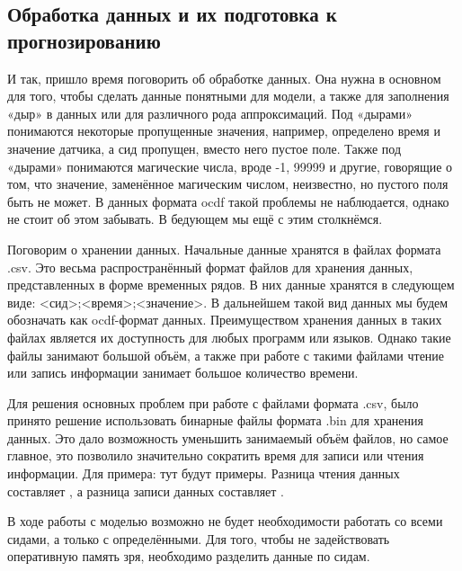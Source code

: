 \titlespace
\subsection*{ 
  \cyrillicfont 
  \fontsize{14pt}{0pt}\selectfont
  \englishfont
   Обработка данных и их подготовка к прогнозированию
} 
\titlespace

{\cyrillicfont 
\fontsize{13pt}{16.25pt}\selectfont 
\englishfont 

  \par \redline И так, пришло время поговорить об обработке данных. Она нужна в основном для того, чтобы сделать данные понятными для модели, а также для заполнения «дыр» в данных или для различного рода аппроксимаций. Под «дырами» понимаются некоторые пропущенные значения, например, определено время и значение датчика, а сид пропущен, вместо него пустое поле. Также под «дырами» понимаются магические числа, вроде -1, 99999 и другие, говорящие о том, что значение, заменённое магическим числом, неизвестно, но пустого поля быть не может. В данных формата ocdf такой проблемы не наблюдается, однако не стоит об этом забывать. В бедующем мы ещё с этим столкнёмся.

  \par \redline Поговорим о хранении данных. Начальные данные хранятся в файлах формата .csv. Это весьма распространённый формат файлов для хранения данных, представленных в форме временных рядов. В них данные хранятся в следующем виде: <сид>;<время>;<значение>. В дальнейшем такой вид данных мы будем обозначать как ocdf-формат данных. Преимуществом хранения данных в таких файлах является их доступность для любых программ или языков. Однако такие файлы занимают большой объём, а также при работе с такими файлами чтение или запись информации занимает большое количество времени.  

  \par \redline Для решения основных проблем при работе с файлами формата .csv, было принято решение использовать бинарные файлы формата .bin для хранения данных. Это дало возможность уменьшить занимаемый объём файлов, но самое главное, это позволило значительно сократить время для записи или чтения информации. Для примера: тут будут примеры.   Разница чтения данных составляет , а разница записи данных составляет .

  \par \redline В ходе работы с моделью возможно не будет необходимости работать со всеми сидами, а только с определёнными. Для того, чтобы не задействовать оперативную память зря, необходимо разделить данные по сидам.   

}
